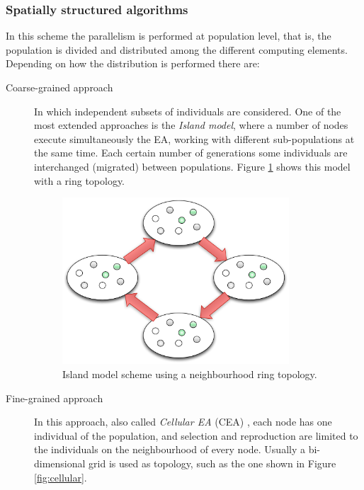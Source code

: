 \documentclass{article}
\begin{document}
\subsubsection{Spatially structured algorithms}
In this scheme the parallelism is performed at population level, that is, the population is divided and distributed among the different computing elements. Depending on how the distribution is performed there are:

\begin{description}
\item[Coarse-grained approach] In which independent subsets of individuals are considered. One of the most extended approaches is the \textit{Island model}, where a number of nodes execute simultaneously the EA, working with different sub-populations at the same time. Each certain number of generations some individuals are interchanged (migrated) between populations. Figure \ref{fig:ring} shows this model with a ring topology.

\begin{figure}[tb]
\centering
\includegraphics[width=20pc]{ring}
\caption{Island model scheme using a neighbourhood ring topology.}
\label{fig:ring}
\end{figure}

\item[Fine-grained approach] In this approach, also called \textit{Cellular EA} (CEA) \cite{alba-cellular-2008}, each node has one individual of the population, and selection and reproduction are limited to the individuals on the neighbourhood of every node. Usually a bi-dimensional grid is used as topology, such as the one shown in Figure \ref{fig:cellular}.


\end{description}
\end{document}

